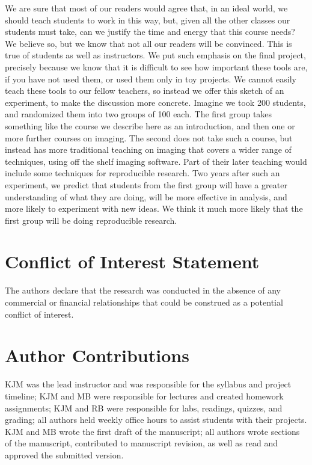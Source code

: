 We are sure that most of our readers would agree that, in an ideal world, we
should teach students to work in this way, but, given all the other
classes our students must take, can we justify the time and energy that this
course needs?  We believe so, but we know that not all our readers will be
convinced.  This is true of students as well as
instructors.  We put such emphasis on the final project, precisely because we
know that it is difficult to see how important these tools are, if you
have not used them, or used them only in toy projects.  We cannot easily teach
these tools to our fellow teachers, so instead we offer this sketch of an
experiment, to make the discussion more concrete.  Imagine we took 200
students, and randomized them into two groups of 100 each.  The first group
takes something like the course we describe here as an introduction, and then
one or more further courses on imaging.  The second does not take such a
course, but instead has more traditional teaching on imaging that covers a
wider range of techniques, using off the shelf imaging software.  Part of
their later teaching would include some techniques for reproducible research.
Two years after such an experiment, we predict that
students from the first group will have a greater understanding of what they
are doing, will be more effective in analysis, and more likely to
experiment with new ideas.  We think it much more likely that the first group
will be doing reproducible research.

\section*{Conflict of Interest Statement}

The authors declare that the research was conducted in the absence of any
commercial or financial relationships that could be construed as a potential
conflict of interest.

\section*{Author Contributions}

KJM was the lead instructor and was responsible for the syllabus and project timeline;
KJM and MB were responsible for lectures and created homework assignments;
KJM and RB were responsible for labs, readings, quizzes, and grading;
all authors held weekly office hours to assist students with their projects.
KJM and MB wrote the first draft of the manuscript;
all authors wrote sections of the manuscript, contributed to manuscript revision, 
as well as read and approved the submitted version.
